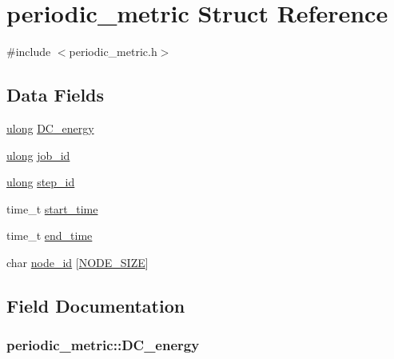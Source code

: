 \hypertarget{structperiodic__metric}{}\section{periodic\+\_\+metric Struct Reference}
\label{structperiodic__metric}


{\ttfamily \#include $<$periodic\+\_\+metric.\+h$>$}

\subsection*{Data Fields}
\begin{DoxyCompactItemize}
\item 
\hyperlink{generic_8h_a718b4eb2652c286f4d42dc18a8e71a1a}{ulong} \hyperlink{structperiodic__metric_a48e7f4fffa2b2fc4d8d3bbdabbe40509}{D\+C\+\_\+energy}
\item 
\hyperlink{generic_8h_a718b4eb2652c286f4d42dc18a8e71a1a}{ulong} \hyperlink{structperiodic__metric_a3f291340bc0cb4d36477ced1e9437e88}{job\+\_\+id}
\item 
\hyperlink{generic_8h_a718b4eb2652c286f4d42dc18a8e71a1a}{ulong} \hyperlink{structperiodic__metric_a8e72fe1eb440769787e10132b9434b15}{step\+\_\+id}
\item 
time\+\_\+t \hyperlink{structperiodic__metric_aed28436309ae898ce1aac2eb595ed5a7}{start\+\_\+time}
\item 
time\+\_\+t \hyperlink{structperiodic__metric_a6030e589cefc38b5d72df99a6f84c3e7}{end\+\_\+time}
\item 
char \hyperlink{structperiodic__metric_a3814ce3bd13bd481d2a05ef775e9707e}{node\+\_\+id} \mbox{[}\hyperlink{periodic__metric_8h_a7ff1bdaea529894a3efdb480b1f2c8ee}{N\+O\+D\+E\+\_\+\+S\+I\+ZE}\mbox{]}
\end{DoxyCompactItemize}


\subsection{Field Documentation}
\subsubsection[{\texorpdfstring{D\+C\+\_\+energy}{DC_energy}}]{ periodic\+\_\+metric\+::\+D\+C\+\_\+energy}\hypertarget{structperiodic__metric_a48e7f4fffa2b2fc4d8d3bbdabbe40509}{}\label{structperiodic__metric_a48e7f4fffa2b2fc4d8d3bbdabbe40509}
